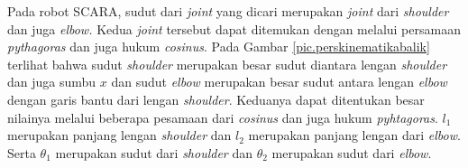 
Pada robot SCARA, sudut dari \textit{joint} yang dicari merupakan \textit{joint} dari \textit{shoulder} dan juga \textit{elbow.} Kedua \textit{joint} tersebut dapat ditemukan dengan melalui persamaan \textit{pythagoras} dan juga hukum \textit{cosinus}. Pada Gambar \ref{pic.perskinematikabalik} terlihat bahwa sudut \textit{shoulder} merupakan besar sudut diantara lengan \textit{shoulder} dan juga sumbu $x$ dan sudut \textit{elbow} merupakan besar sudut antara lengan \textit{elbow} dengan garis bantu dari lengan \textit{shoulder}. Keduanya dapat ditentukan besar nilainya melalui beberapa pesamaan dari \textit{cosinus} dan juga hukum \textit{pyhtagoras}. $l_{1}$ merupakan panjang lengan \textit{shoulder} dan $l_{2}$ merupakan panjang lengan dari \textit{elbow}. Serta $\theta_{1}$ merupakan sudut dari \textit{shoulder} dan $\theta_{2}$ merupakan sudut dari \textit{elbow}.  

